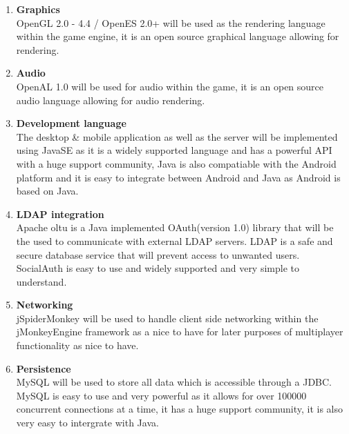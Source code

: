 \documentclass[letterpaper]{article}
\begin{document}
		\begin{enumerate}					
					\item \textbf{Graphics}
					\\OpenGL 2.0 - 4.4 / OpenES 2.0+ will be used as the rendering language within the game engine, it is an open source graphical language allowing for rendering.
					
					\item \textbf{Audio}
					\\OpenAL 1.0 will be used for audio within the game, it is an open source audio language allowing for audio rendering.
					
					\item \textbf{Development language}
					\\The desktop \& mobile application as well as the server will be implemented using JavaSE as it is a widely supported language and has a powerful API with a huge support community, Java is also compatiable with the Android platform and it is easy to integrate between Android and Java as Android is based on Java.
					
					\item \textbf{LDAP integration}
					\\Apache oltu is a Java implemented OAuth(version 1.0) library that will be the used to communicate with external LDAP servers. LDAP is a safe and secure database service that will prevent access to unwanted users. SocialAuth is easy to use and widely supported and very simple to understand.
					
					\item \textbf{Networking}
					\\jSpiderMonkey will be used to handle client side networking within the jMonkeyEngine framework as a nice to have for later purposes of multiplayer functionality as nice to have.
					
					\item \textbf{Persistence}
					\\MySQL will be used to store all data which is accessible through a JDBC. MySQL is easy to use and very powerful as it allows for over 100000 concurrent connections at a time, it has a huge support community, it is also very easy to intergrate with Java. \\
				\end{enumerate}
			
\end{document}
